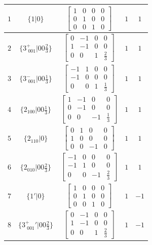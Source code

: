 \documentclass[fleqn,8pt]{jsarticle}
\begin{document}
\begin{longtable}{ccccc}
$ 1 $ & $ \{1|0\} $ & $ \begin{bmatrix} 1 & 0 & 0 & 0 \\ 0 & 1 & 0 & 0 \\ 0 & 0 & 1 & 0 \end{bmatrix} $ & $ 1 $ & $ 1 $ \\ \hline
$ 2 $ & $ \{3^{+}_{\,\,001}|0 0 \frac{2}{3}\} $ & $ \begin{bmatrix} 0 & -1 & 0 & 0 \\ 1 & -1 & 0 & 0 \\ 0 & 0 & 1 & \frac{2}{3} \end{bmatrix} $ & $ 1 $ & $ 1 $ \\ \hline
$ 3 $ & $ \{3^{-}_{\,\,001}|0 0 \frac{1}{3}\} $ & $ \begin{bmatrix} -1 & 1 & 0 & 0 \\ -1 & 0 & 0 & 0 \\ 0 & 0 & 1 & \frac{1}{3} \end{bmatrix} $ & $ 1 $ & $ 1 $ \\ \hline
$ 4 $ & $ \{2{}_{100}|0 0 \frac{1}{3}\} $ & $ \begin{bmatrix} 1 & -1 & 0 & 0 \\ 0 & -1 & 0 & 0 \\ 0 & 0 & -1 & \frac{1}{3} \end{bmatrix} $ & $ 1 $ & $ 1 $ \\ \hline
$ 5 $ & $ \{2{}_{110}|0\} $ & $ \begin{bmatrix} 0 & 1 & 0 & 0 \\ 1 & 0 & 0 & 0 \\ 0 & 0 & -1 & 0 \end{bmatrix} $ & $ 1 $ & $ 1 $ \\ \hline
$ 6 $ & $ \{2{}_{010}|0 0 \frac{2}{3}\} $ & $ \begin{bmatrix} -1 & 0 & 0 & 0 \\ -1 & 1 & 0 & 0 \\ 0 & 0 & -1 & \frac{2}{3} \end{bmatrix} $ & $ 1 $ & $ 1 $ \\ \hline
$ 7 $ & $ \{1{}'|0\} $ & $ \begin{bmatrix} 1 & 0 & 0 & 0 \\ 0 & 1 & 0 & 0 \\ 0 & 0 & 1 & 0 \end{bmatrix} $ & $ 1 $ & $ -1 $ \\ \hline
$ 8 $ & $ \{3^{+}_{\,\,001}{}'|0 0 \frac{2}{3}\} $ & $ \begin{bmatrix} 0 & -1 & 0 & 0 \\ 1 & -1 & 0 & 0 \\ 0 & 0 & 1 & \frac{2}{3} \end{bmatrix} $ & $ 1 $ & $ -1 $ \\ \hline

\end{longtable}
\end{document}
